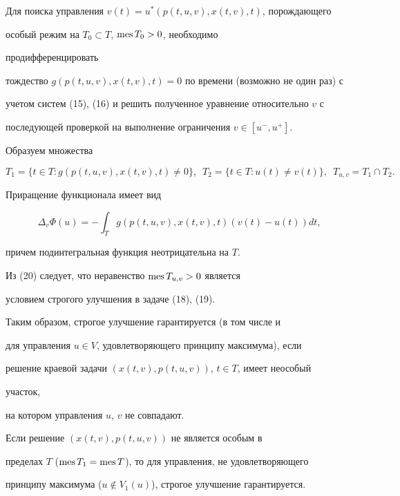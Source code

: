 Для поиска управления $v(t)=u^*(p(t,u,v),x(t,v),t)$, порождающего 


особый режим на $T_0\subset T$, $\operatorname{mes} T_0>0$, необходимо 


продифференцировать


тождество $g(p(t,u,v),x(t,v),t)=0$ по времени (возможно не один раз) с 


учетом систем (15), (16) и решить полученное уравнение относительно $v$ с 


последующей проверкой на выполнение ограничения $v\in[u^-,u^+]$.





Образуем множества


$$


T_1=\{t\in T:g(p(t,u,v),x(t,v),t)\ne0\},\ \;


T_2=\{t\in T:u(t)\ne v(t)\}, \ \; T_{u,v}=T_1\cap T_2.


$$


Приращение функционала имеет вид


\begin{equation}


\Delta_v\Phi(u)=-\int_T g(p(t,u,v),x(t,v),t)


(v(t)-u(t))dt,


\end{equation}


причем подинтегральная функция неотрицательна на $T$.


Из (20) следует, что неравенство $\operatorname{mes} T_{u,v}>0$ является


условием строгого улучшения в задаче (18), (19).





Таким образом, строгое улучшение гарантируется (в том числе и


для управления $u\in V$, удовлетворяющего принципу максимума), если


решение краевой задачи $(x(t,v),p(t,u,v))$, $t\in T$, имеет неособый 


участок,


на котором управления $u$, $v$ не совпадают.





\begin{cor}


Если решение $(x(t,v),p(t,u,v))$ не является особым в


пределах $T$ ($\operatorname{mes} T_1=\operatorname{mes} T$), то для управления, не удовлетворяющего


принципу максимума ($u\notin V_1(u)$), строгое улучшение гарантируется. 


\end{cor}





